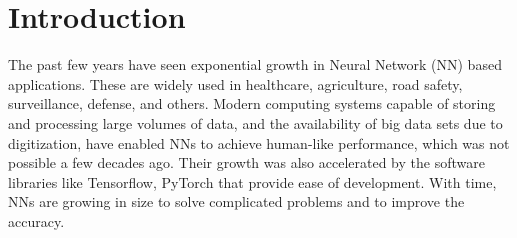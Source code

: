 \graphicspath{{./Ch1-Introduction/images/}}

\chapter{Introduction} \label{chap:introduction}
\begin{comment}
//clearly come out what are you doing in this thesis and what are the contributions
//what field you are targetting, scope and motivation, what problems, to justify your contributions.
1. About AI/ML/NN/DNNs: Applications, Domains, Growth, Type of NNs, Training and inference, 

2. Modern DNNs, architectures and popular NNs

3. Example: Number of computations, parameters: Illustrate compute and memory intensive operations.
Number of layer

4. Edge vs. Cloud Computing. 

5. Edge AI Challenges

6. About the Architectures for Edge AI Accelerators: Give wider scope of these architectures, and specific type of architectures. Trade-offs.

7. Performance bottlenecks for edge AI: Memory and Throughput bottlenecks.
Memory accesses are the key botllenecks for these edge AI devices. 

6. Summary and Outline of the Thesis.

\end{comment}

The past few years have seen exponential growth in Neural Network (NN) based applications. These are widely used in healthcare, agriculture, road safety, surveillance, defense, and others. Modern computing systems capable of storing and processing large volumes of data, and the availability of big data sets due to digitization, have enabled NNs to achieve human-like performance, which was not possible a few decades ago. Their growth was also accelerated by the software libraries like Tensorflow, PyTorch that provide ease of development. With time, NNs are growing in size to solve complicated problems and to improve the accuracy. 

